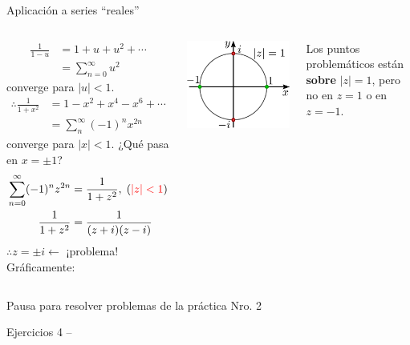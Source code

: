 \documentclass[9pt, aspectratio=169]{beamer}
\begin{document}
\begin{frame}{Aplicación a series ``reales''}
    \begin{columns}[c]
    \begin{align*}
    \frac{1}{1 - u} &= 1 + u + u^2 + \cdots \\
                    &= \sum_{n = 0}^{\infty} u^2
    \end{align*}
    converge para $|u| < 1$.
    \begin{align*}
    \therefore \frac{1}{1 + x^2} &= 1 - x^2 + x^4 - x^6 + \cdots \\
                                 &= \sum_{n}^{\infty} (-1)^n x^{2n}
    \end{align*}
    converge para $|x| < 1$.
    ¿Qué pasa en $x = \pm 1$?
    \begin{align*}
        \sum_{n = 0}^{\infty} (-1)^n z^{2n} &= \frac{1}{1 + z^2}, \; ({\color{red}|z| < 1}) \\
    \frac{1}{1 + z^2} &= \frac{1}{(z + i)(z -i)}
    \end{align*}
$\therefore z = \pm i \leftarrow $ \alert{¡problema!}
    Gráficamente:
    \begin{center}
    \includegraphics[scale=0.40]{figs/fig-09.pdf}
    \end{center}
    Los puntos problemáticos están \textbf{sobre} $|z| = 1$, pero no en $z = 1$ o en $z = -1$.
    \end{columns}
\end{frame}

\begin{frame}[standout]
Pausa para resolver problemas de la práctica Nro. 2

Ejercicios 4 --
\end{frame}
\end{document}
